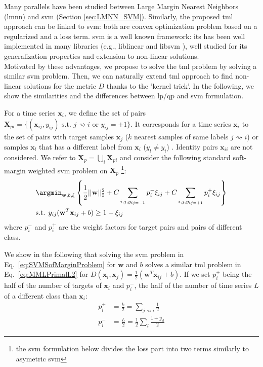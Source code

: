 Many parallels have been studied between Large Margin Nearest Neighbors ({\sc lmnn}) and {\sc svm} (Section \ref{sec:LMNN_SVM}). Similarly, the proposed {\sc tml} approach can be linked to {\sc svm}: both are convex optimization problem based on a regularized and a loss term. {\sc svm} is a well known framework: its has been well implemented in many libraries (e.g., {\sc liblinear} \cite{Fan2008} and {\sc libsvm} \cite{Hsu2008}), well studied for its generalization properties and extension to non-linear solutions. \\
\indent Motivated by these advantages, we propose to solve the {\sc tml} problem by solving a similar {\sc svm} problem. Then, we can naturally extend {\sc tml} approach to find non-linear solutions for the metric $D$ thanks to the 'kernel trick'. 
In the following, we show the similarities and the differences between {\sc lp}/{\sc qp} and {\sc svm} formulation.

For a time series $\textbf{x}_i$, we define the set of pairs $\textbf{X}_{pi}=\{(\textbf{x}_{ij},y_{ij}) \text{ s.t. } j\rightsquigarrow i \text{ or } y_{ij}=+1\}$. It corresponds for a time series $\textbf{x}_i$ to the set of pairs with target samples $\textbf{x}_j$ ($k$ nearest samples of same labels $j\rightsquigarrow i$) or samples $\textbf{x}_l$ that has a different label from $\textbf{x}_i$ ($y_l \neq y_i$) . Identity pairs $\textbf{x}_{ii}$ are not considered. We refer to $\textbf{X}_{p}=\bigcup\limits_{i} \textbf{X}_{pi}$ and consider the following standard soft-margin weighted {\sc svm} problem on $\textbf{X}_p$ \footnote{the {\sc svm} formulation below divides the loss part into two terms similarly to asymetric {\sc svm}}: 
\begin{equation}
\begin{aligned}
&\displaystyle \argmin_{\textbf{w},b,\xi} 
\left\lbrace \frac{1}{2}||\textbf{w}||_2^2
+ C \sum\limits_{i,j,y_{ij=-1}}p_i^-\xi_{ij}
+ C \sum\limits_{i,j, y_{ij=+1}}p_i^+\xi_{ij} \right\rbrace \\
& \text{s.t.  }  y_{ij}(\textbf{w}^T\textbf{x}_{ij}+b) \geq 1-\xi_{ij}
\end{aligned}
\label{eq:SVMSofMarginProblem}
\end{equation}
\noindent where $p_i^-$ and $p_i^+$ are the weight factors for target pairs and pairs of different class.

\noindent  We show in the following that solving the {\sc svm} problem in Eq.~\ref{eq:SVMSofMarginProblem} for $\textbf{w}$ and $b$ solves a similar {\sc tml} problem in Eq.~\ref{eq:MMLPrimalL2} for $D(\textbf{x}_i,\textbf{x}_j)=\frac{1}{2}(\textbf{w}^T\textbf{x}_{ij}+b)$. If we set $p_i^+$ being the half of the number of targets of $\textbf{x}_i$ and $p_i^-$, the half of the number of time series $L$ of a different class than $\textbf{x}_i$:
\begin{align}
p_i^+ &= \frac{k}{2} = \sum_{j \rightsquigarrow i} \frac{1}{2} \label{eq:pi_plus}\\
p_i^- &= \frac{L}{2} = \frac{1}{2}\sum_l \frac{1+y_{il}}{2} \label{eq:pi_moins}
\end{align}

